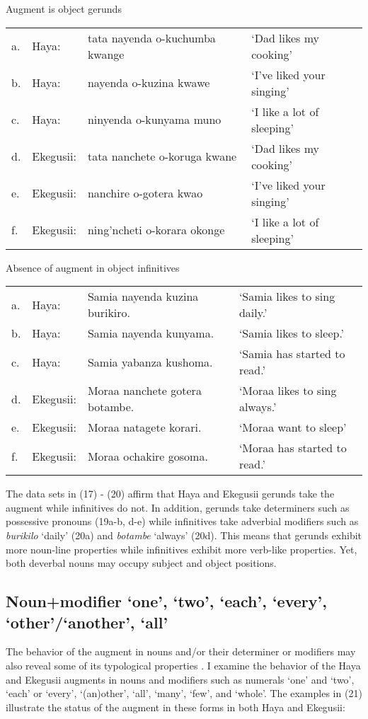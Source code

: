 \documentclass[output=paper]{langscibook}
\begin{document}
\begin{exe}
\ex Augment is object gerunds\\
\label{hayagusii19}
\begin{tabular}{llll}
  a. &	Haya:	&	tata nayenda o-kuchumba kwange &	‘Dad likes my cooking’\\
b. &	Haya:	&	nayenda o-kuzina kwawe	&	‘I’ve liked your singing’	\\
c. &	Haya:	&	ninyenda o-kunyama muno	&	‘I like a lot of sleeping’\\
d. &	Ekegusii: &	tata nanchete o-koruga kwane &		‘Dad likes my cooking’\\
e. &	Ekegusii: &	nanchire o-gotera kwao	&	‘I’ve liked your singing’\\
f. &	Ekegusii: &	ning’ncheti o-korara okonge	&	‘I like a lot of sleeping’\\
\end{tabular}

\ex Absence of augment in object infinitives\\
\label{hayagusii20}
\begin{tabular}{llll}
  a. &	Haya: 	&	Samia nayenda kuzina burikiro. &	‘Samia likes to sing daily.’\\		
b.&	Haya: 	&	Samia nayenda kunyama. 	&	‘Samia likes to sleep.’	\\	
c. &	Haya: 	&	Samia yabanza kushoma. 	&	‘Samia has started to read.’\\	
d. &	Ekegusii: &	Moraa nanchete gotera botambe.&	‘Moraa likes to sing always.’\\
e. &	Ekegusii: &	Moraa natagete korari.	&	‘Moraa want to sleep’\\
f. &	Ekegusii: &	Moraa ochakire gosoma. 	&	‘Moraa has started to read.’\\
\end{tabular}
\end{exe}

The data sets in (17) - (20) affirm that Haya and Ekegusii gerunds take the augment while infinitives do not. In addition, gerunds take determiners such as possessive pronouns (19a-b, d-e) while infinitives take adverbial modifiers such as \textit{burikilo} ‘daily’ (20a) and \textit{botambe} ‘always’ (20d).  This means that gerunds exhibit more noun-line properties while infinitives exhibit more verb-like properties. Yet, both deverbal nouns may occupy subject and object positions.

\subsection{Noun+modifier ‘one’, ‘two’, ‘each’, ‘every’, ‘other’/‘another’, ‘all’}
The behavior of the augment in nouns and/or their determiner or modifiers may also reveal some of its typological properties \citep{blois1970augment}. I examine the behavior of the Haya and Ekegusii augments in nouns and  modifiers such as numerals ‘one’ and ‘two’, ‘each’ or ‘every’, ‘(an)other’, ‘all’, ‘many’, ‘few’, and ‘whole’. The examples in (21) illustrate the status of the augment in these forms in both Haya and Ekegusii: 
\end{document}

